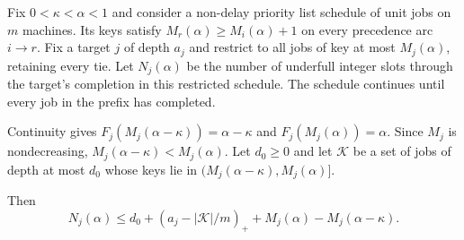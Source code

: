 Fix $0<\kappa<\alpha<1$ and consider a non-delay priority list schedule of
unit jobs on $m$ machines. Its keys satisfy $M_r(\alpha)\ge M_i(\alpha)+1$ on every precedence arc
$i\to r$. Fix a target $j$ of depth $a_j$ and restrict
to all jobs of key at most $M_j(\alpha)$, retaining every tie. Let $N_j(\alpha)$ be the
number of underfull integer slots through the target's completion in
this restricted schedule. The schedule continues until every job in the
prefix has completed.

Continuity gives $F_j(M_j(\alpha-\kappa))=\alpha-\kappa$ and
$F_j(M_j(\alpha))=\alpha$. Since $M_j$ is nondecreasing,
$M_j(\alpha-\kappa)<M_j(\alpha)$. Let $d_0\ge0$ and let $\mathcal K$
be a set of jobs of depth at most $d_0$ whose keys lie in
$(M_j(\alpha-\kappa),M_j(\alpha)]$.

\begin{lemma}
Then
\begin{equation}
 N_j(\alpha)\le d_0+(a_j-|\mathcal K|/m)_++M_j(\alpha)-M_j(\alpha-\kappa).
 \label{eq:priority-band}
\end{equation}
\end{lemma}

